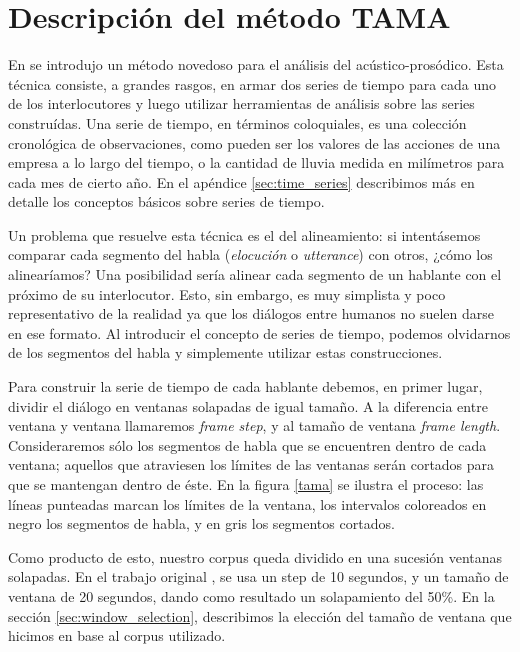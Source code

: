 \section{Descripción del método TAMA}
\label{sec:ant_tama}

En \cite{KOU2008} se introdujo un método novedoso para el análisis del \entrainment acústico-prosódico. Esta técnica consiste, a grandes rasgos, en armar dos series de tiempo para cada uno de los interlocutores y luego utilizar herramientas de análisis sobre las series construídas. Una serie de tiempo, en términos coloquiales, es una colección cronológica de observaciones, como pueden ser los valores de las acciones de una empresa a lo largo del tiempo, o la cantidad de lluvia medida en milímetros para cada mes de cierto año. En el apéndice \ref{sec:time_series} describimos más en detalle los conceptos básicos sobre series de tiempo.

Un problema que resuelve esta técnica es el del alineamiento: si intentásemos comparar cada segmento del habla (\emph{elocución} o \emph{utterance}) con otros, ¿cómo los alinearíamos? Una posibilidad sería alinear cada segmento de un hablante con el próximo de su interlocutor. Esto, sin embargo, es muy simplista y poco representativo de la realidad ya que los diálogos entre humanos no suelen darse en ese formato. Al introducir el concepto de series de tiempo, podemos olvidarnos de los segmentos del habla y simplemente utilizar estas construcciones.

Para construir la serie de tiempo de cada hablante debemos, en primer lugar, dividir el diálogo en ventanas solapadas de igual tamaño. A la diferencia entre ventana y ventana llamaremos \emph{frame step}, y al tamaño de ventana \emph{frame length}. Consideraremos sólo los segmentos de habla que se encuentren dentro de cada ventana; aquellos que atraviesen los límites de las ventanas serán cortados para que se mantengan dentro de éste. En la figura \ref{tama} se ilustra el proceso: las líneas punteadas marcan los límites de la ventana, los intervalos coloreados en negro los segmentos de habla, y en gris los segmentos cortados.

Como producto de esto, nuestro corpus queda dividido en una sucesión ventanas solapadas. En el trabajo original \cite{KOU2008}, se usa un step de 10 segundos, y un tamaño de ventana de 20 segundos, dando como resultado un solapamiento del 50\%. En la sección \ref{sec:window_selection}, describimos la elección del tamaño de ventana que hicimos en base al corpus utilizado.

